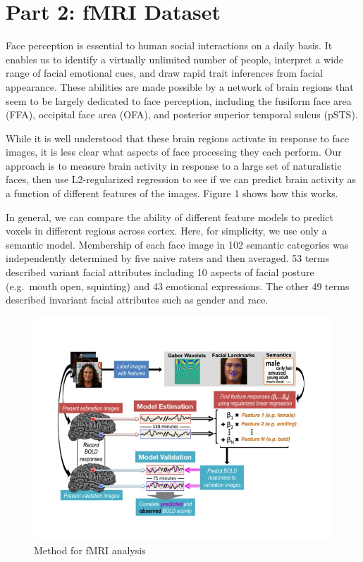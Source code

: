 \documentclass[11pt,notitlepage]{article}
\begin{document}
\newpage

\section*{Part 2: fMRI Dataset}


Face perception is essential to human social interactions on a daily
basis. It enables us to identify a virtually unlimited number of people,
interpret a wide range of facial emotional cues, and draw rapid trait
inferences from facial appearance. These abilities are made possible by
a network of brain regions that seem to be largely dedicated to face
perception, including the fusiform face area (FFA), occipital face area
(OFA), and posterior superior temporal sulcus (pSTS).

While it is well understood that these brain regions activate in
response to face images, it is less clear what aspects of face
processing they each perform. Our approach is to measure brain activity
in response to a large set of naturalistic faces, then use
L2-regularized regression to see if we can predict brain activity as a
function of different features of the images. Figure 1 shows how this
works.

In general, we can compare the ability of different feature models to
predict voxels in different regions across cortex. Here, for simplicity,
we use only a semantic model. Membership of each face image in 102
semantic categories was independently determined by five naive raters
and then averaged. 53 terms described variant facial attributes
including 10 aspects of facial posture (e.g.~mouth open, squinting) and
43 emotional expressions. The other 49 terms described invariant facial
attributes such as gender and race.


\begin{figure}[h c] %
\centering
\includegraphics[scale = .60]{Figures/Slide4.jpg}
\caption{\footnotesize Method for fMRI analysis}
\end{figure}
\end{document}
